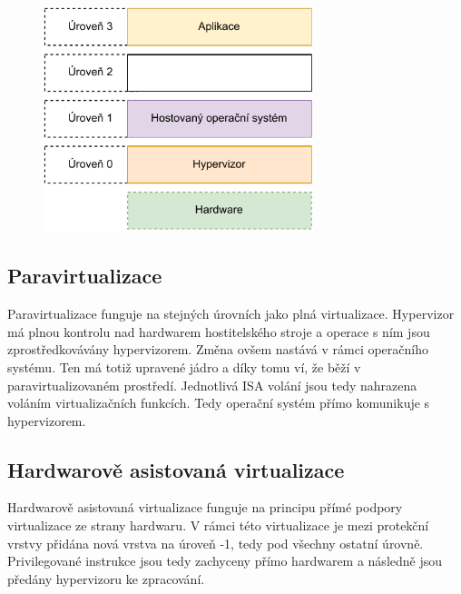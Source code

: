 \begin{figure}[htbp]
    \centering 
    \includegraphics[width=0.7\textwidth]{assets/img/full_virt.pdf}
    \label{fig:full_virt}
\end{figure}


\subsection{Paravirtualizace}

Paravirtualizace funguje na stejných úrovních jako plná virtualizace. Hypervizor má plnou kontrolu nad hardwarem hostitelského stroje a operace s ním jsou zprostředkovávány hypervizorem. Změna ovšem nastává v rámci operačního systému. Ten má totiž upravené jádro a díky tomu ví, že běží v paravirtualizovaném prostředí. Jednotlivá ISA volání jsou tedy nahrazena voláním virtualizačních funkcích. Tedy operační systém přímo komunikuje s hypervizorem.\,\cite{4709159}


\subsection{Hardwarově asistovaná virtualizace}

Hardwarově asistovaná virtualizace funguje na principu přímé podpory virtualizace ze strany hardwaru. V rámci této virtualizace je mezi protekční vrstvy přidána nová vrstva na úroveň -1, tedy pod všechny ostatní úrovně. Privilegované instrukce jsou tedy zachyceny přímo hardwarem a následně jsou předány hypervizoru ke zpracování.\cite{4709159}

